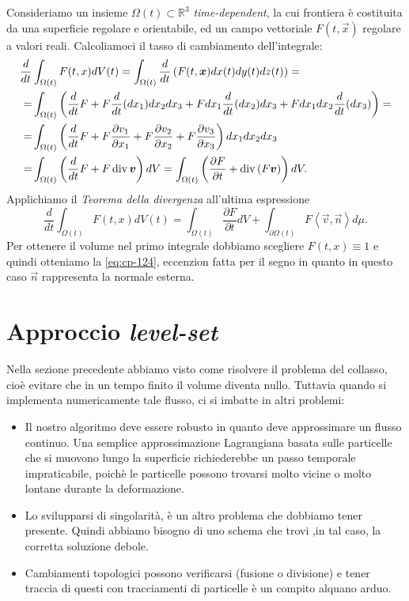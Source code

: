 \begin{osservazione}
\label{oss:cp-122}
Consideriamo un insieme $\Omega(t)\subset\mathbb{R}^3$ \emph{time-dependent}, la cui frontiera è costituita da una superficie regolare e orientabile, ed un campo vettoriale $F(t,\vec{x})$ regolare a valori reali. Calcoliamoci il tasso di cambiamento dell'integrale:
\[
\begin{aligned}
\frac{d}{dt}&\int_{\Omega(t)}F(t,x)dV(t) = \int_{\Omega(t)}\frac{d}{dt}\left(F(t,\bm{x})dx(t)dy(t)dz(t)\right)=\\
 =&\int_{\Omega(t)}\left(\frac{d}{dt}F + F\frac{d}{dt}(dx_1)dx_2dx_3 + Fdx_1\frac{d}{dt}(dx_2)dx_3 + Fdx_1dx_2\frac{d}{dt}(dx_3)\right)=\\
=&\int_{\Omega(t)}\left(\frac{d}{dt}F + F\frac{\partial v_1}{\partial x_1}+ F\frac{\partial v_2}{\partial x_2} + F\frac{\partial v_3}{\partial x_3}\right)dx_1dx_2dx_3\\
=& \int_{\Omega(t)}\left(\frac{d}{dt}F + F\operatorname{div}{\bm{v}}\right)dV = \int_{\Omega(t)}\left(\frac{\partial F}{\partial t} + \operatorname{div}{(F\bm{v})}\right)dV.
\end{aligned}
\]
Applichiamo il \emph{Teorema della divergenza} all'ultima espressione
\[
\frac{d}{dt}\int_{\Omega(t)}F(t,x)dV(t)=\int_{\Omega(t)}\frac{\partial F}{\partial t}dV + \int_{\partial \Omega(t)}F\left<\vec{v},\vec{n}\right>d\mu.
\]
Per ottenere il volume nel primo integrale dobbiamo scegliere $F(t,x)\equiv 1$ e quindi otteniamo la \eqref{eq:cp-124}, eccenzion fatta per il segno in quanto in questo caso $\vec{n}$ rappresenta la normale esterna.
\end{osservazione}
%
%
%
%
\section{Approccio \emph{level-set}}  

Nella sezione precedente abbiamo visto come risolvere il problema del collasso, cioè evitare che in un tempo finito il volume diventa nullo. Tuttavia quando si implementa numericamente tale flusso, ci si imbatte in altri problemi:
\begin{itemize}

  \item Il nostro algoritmo deve essere robusto in quanto deve approssimare un flusso continuo. Una semplice approssimazione Lagrangiana basata sulle particelle che si muovono lungo la superficie richiederebbe un passo temporale impraticabile, poichè le particelle possono trovarsi molto vicine o molto lontane durante la deformazione.

   \item Lo svilupparsi di singolarità, è un altro problema che dobbiamo tener presente. Quindi abbiamo bisogno di uno schema che trovi ,in tal caso, la corretta soluzione debole.
   
   \item Cambiamenti topologici possono verificarsi (fusione o divisione) e tener traccia di questi con tracciamenti di particelle è un compito alquano arduo.

\end{itemize}

